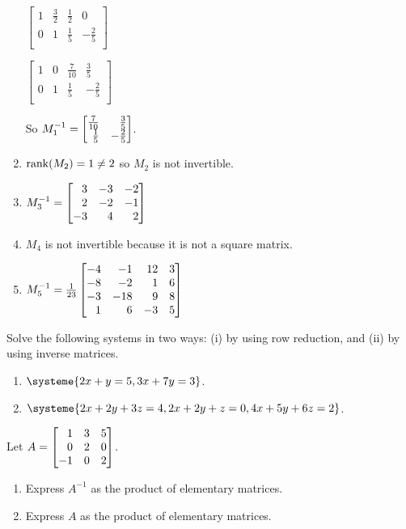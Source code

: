 \begin{exercises}
\begin{problist}
\begin{solution}
\begin{enumerate}
				$\left[\begin{array}{cc|cc}
							1&\frac{3}{2}&\frac{1}{2}&0\\
							0&1&\frac{1}{5}&-\frac{2}{5}\\
							\end{array}\right]$

				$\left[\begin{array}{cc|cc}
							1&0&\frac{7}{10}&\frac{3}{5}\\
							0&1&\frac{1}{5}&-\frac{2}{5}\\
							\end{array}\right]$

				So $M_{1}^{-1}=\mat{\frac{7}{10}&\frac{3}{5}\\
								 \frac{1}{5}&-\frac{2}{5}\\}$.
				\item $\operatorname{rank}(M_{2})=1\neq2$ so $M_{2}$ is not invertible.
				\item $M_{3}^{-1}=\mat{3&-3&-2\\2&-2&-1\\-3&4&2}$
				\item $M_{4}$ is not invertible because it is not a square matrix.
				\item $M_{5}^{-1}=\frac{1}{23}\mat{-4&-1&12&3\\-8&-2&1&6\\-3&-18&9&8\\1&6&-3&5}$
			\end{enumerate}
		\end{solution}

		\prob Solve the following systems in two ways: (i) by using row reduction,
		and (ii) by using inverse matrices.
		\begin{enumerate}
			\item $\systeme{2x+y=5,3x+7y=3}$.

			\item $\systeme{2x+2y+3z=4,2x+2y+z=0, 4x+5y+6z=2}$.
		\end{enumerate}

		\prob Let $A=\mat{1&3&5\\0&2&0\\-1&0&2}$.
		\begin{enumerate}
			\item Express $A^{-1}$ as the product of elementary matrices.

			\item Express $A$ as the product of elementary matrices.
		\end{enumerate}


\end{problist}
\end{exercises}
